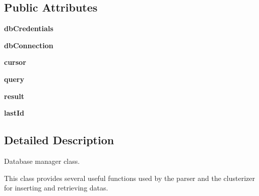 \subsection*{Public Attributes}
\begin{DoxyCompactItemize}
\item 
\hypertarget{classpostgreDb_1_1DatabaseWrapper_1_1DatabaseWrapper_af969f29436d83972aecddc24f5f4b87a}{}{\bfseries db\+Credentials}\label{classpostgreDb_1_1DatabaseWrapper_1_1DatabaseWrapper_af969f29436d83972aecddc24f5f4b87a}

\item 
\hypertarget{classpostgreDb_1_1DatabaseWrapper_1_1DatabaseWrapper_ab5999a62ae92f81416fd6741d5a6e3c2}{}{\bfseries db\+Connection}\label{classpostgreDb_1_1DatabaseWrapper_1_1DatabaseWrapper_ab5999a62ae92f81416fd6741d5a6e3c2}

\item 
\hypertarget{classpostgreDb_1_1DatabaseWrapper_1_1DatabaseWrapper_a8629b82a576ed03db75094298af03986}{}{\bfseries cursor}\label{classpostgreDb_1_1DatabaseWrapper_1_1DatabaseWrapper_a8629b82a576ed03db75094298af03986}

\item 
\hypertarget{classpostgreDb_1_1DatabaseWrapper_1_1DatabaseWrapper_a640fa9c122fbf0cfc31aa88c1558efa3}{}{\bfseries query}\label{classpostgreDb_1_1DatabaseWrapper_1_1DatabaseWrapper_a640fa9c122fbf0cfc31aa88c1558efa3}

\item 
\hypertarget{classpostgreDb_1_1DatabaseWrapper_1_1DatabaseWrapper_a12faa4065d1d574cc947645a20d86c22}{}{\bfseries result}\label{classpostgreDb_1_1DatabaseWrapper_1_1DatabaseWrapper_a12faa4065d1d574cc947645a20d86c22}

\item 
\hypertarget{classpostgreDb_1_1DatabaseWrapper_1_1DatabaseWrapper_adda93c3fa92a2c45999b87d076fffd2d}{}{\bfseries last\+Id}\label{classpostgreDb_1_1DatabaseWrapper_1_1DatabaseWrapper_adda93c3fa92a2c45999b87d076fffd2d}

\end{DoxyCompactItemize}


\subsection{Detailed Description}
\begin{DoxyVerb}Database manager class.

This class provides several useful functions used by the parser
and the clusterizer for inserting and retrieving datas.
\end{DoxyVerb}
 

